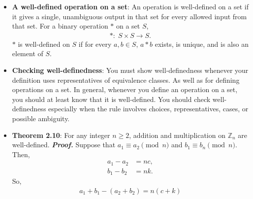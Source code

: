 \documentclass{report}
\begin{document}
\begin{itemize}
            $\endpf$
            \bigbreak \noindent 
            Now, consider 
            \begin{align*}
                [a][b] &= \left\{xy:\; x \in [a], y \in [b]\right\}, \\
                [a\cdot b] &= \left\{z \in \mathbb{Z}:\; ab \equiv z \pmod{n}\right\}
            .\end{align*}
            We assert that 
            \begin{align*}
                \left\{xy:\; x \in [a], y \in [b]\right\} =  \left\{z \in \mathbb{Z}:\; ab \equiv z \pmod{n}\right\}
            .\end{align*}
            The proof for this is non-trivial. Instead of proving these two operations, we can instead define them as such, and show that they are well-defined.
        \item \textbf{A well-defined operation on a set}: An operation is well-defined on a set if it gives a single, unambiguous output in that set for every allowed input from that set. For a binary operation $*$ on a set $S$, 
            \begin{align*}
                *:\; S \times S \to S
            .\end{align*}
            $*$ is well-defined on $S$ if for every $a,b \in S$, $a*b$ exists, is unique, and is also an element of $S$.
        \item \textbf{Checking well-definedness}: You must show well-definedness whenever your definition uses representatives of equivalence classes. As well as for defining operations on a set.
            \bigbreak \noindent 
            In general, whenever you define an operation on a set, you should at least know that it is well-defined. You should check well-definedness especially when the rule involves choices, representatives, cases, or possible ambiguity.
        \item \textbf{Theorem 2.10}: For any integer $ n \geq 2$, addition and multiplication on $ \mathbb{Z}_{n}$ are well-defined.
            \bigbreak \noindent 
            \textbf{\textit{Proof.}} Suppose that $a_{1} \equiv a_{2} \pmod{n}$ and $b_{1} \equiv b_{n} \pmod{n}$. Then, 
            \begin{align*}
                a_{1} - a_{2} &= nc, \\
                b_{1} - b_{2} &= nk
            .\end{align*}
            So,
            \begin{align*}
                a_{1} + b_{1} - (a_{2} + b_{2}) = n(c+k)

\end{align*}
\end{itemize}
\end{document}
